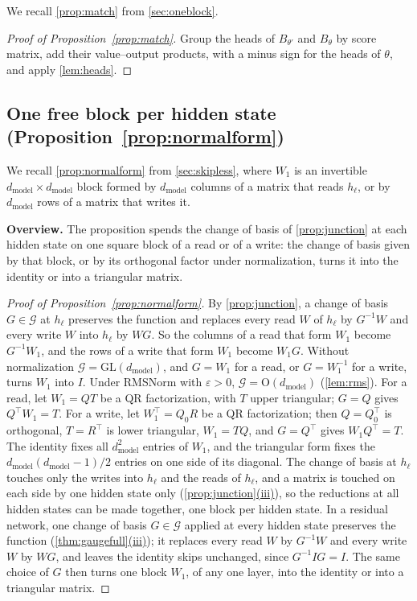 \documentclass[10pt]{article}
\theoremstyle{definition}
\theoremstyle{remark}
\newcommand{\dm}{d_{\mathrm{model}}}
\newcommand{\GL}{\mathrm{GL}}
\newcommand{\Ort}{\mathrm{O}}
\newcommand{\G}{\mathcal{G}}
\newcommand{\para}[1]{\smallskip\noindent\textbf{#1}\hspace{0.5em}}
\DeclareRobustCommand{\cpref}[2]{\hyperref[#1:#2]{\cref*{#1}(#2)}}
\begin{document}
We recall \cref{prop:match} from \cref{sec:oneblock}.
\propMatch*

\begin{proof}[Proof of Proposition~\ref{prop:match}]
Group the heads of $B_{\theta'}$ and $B_\theta$ by score matrix, add their value--output products, with a minus sign for the heads of $\theta$, and apply \cref{lem:heads}.
\end{proof}

\subsection{One free block per hidden state\texorpdfstring{ (Proposition~\ref*{prop:normalform})}{}}\label{app:prf-normalform}

We recall \cref{prop:normalform} from \cref{sec:skipless}, where $W_1$ is an invertible $\dm \times \dm$ block formed by $\dm$ columns of a matrix that reads $h_\ell$, or by $\dm$ rows of a matrix that writes it.
\propNormalForm*

\para{Overview.} The proposition spends the change of basis of \cref{prop:junction} at each hidden state on one square block of a read or of a write: the change of basis given by that block, or by its orthogonal factor under normalization, turns it into the identity or into a triangular matrix.

\begin{proof}[Proof of Proposition~\ref{prop:normalform}]
By \cref{prop:junction}, a change of basis $G \in \G$ at $h_\ell$ preserves the function and replaces every read $W$ of $h_\ell$ by $G^{-1}W$ and every write $W$ into $h_\ell$ by $WG$. So the columns of a read that form $W_1$ become $G^{-1}W_1$, and the rows of a write that form $W_1$ become $W_1G$. Without normalization $\G = \GL(\dm)$, and $G = W_1$ for a read, or $G = W_1^{-1}$ for a write, turns $W_1$ into $I$. Under RMSNorm with $\varepsilon > 0$, $\G = \Ort(\dm)$ (\cref{lem:rms}). For a read, let $W_1 = QT$ be a QR factorization, with $T$ upper triangular; $G = Q$ gives $Q^\top W_1 = T$. For a write, let $W_1^\top = Q_0R$ be a QR factorization; then $Q = Q_0^\top$ is orthogonal, $T = R^\top$ is lower triangular, $W_1 = TQ$, and $G = Q^\top$ gives $W_1Q^\top = T$. The identity fixes all $\dm^2$ entries of $W_1$, and the triangular form fixes the $\dm(\dm-1)/2$ entries on one side of its diagonal. The change of basis at $h_\ell$ touches only the writes into $h_\ell$ and the reads of $h_\ell$, and a matrix is touched on each side by one hidden state only (\cpref{prop:junction}{iii}), so the reductions at all hidden states can be made together, one block per hidden state. In a residual network, one change of basis $G \in \G$ applied at every hidden state preserves the function (\cpref{thm:gaugefull}{iii}); it replaces every read $W$ by $G^{-1}W$ and every write $W$ by $WG$, and leaves the identity skips unchanged, since $G^{-1}IG = I$. The same choice of $G$ then turns one block $W_1$, of any one layer, into the identity or into a triangular matrix.
\end{proof}
\end{document}
